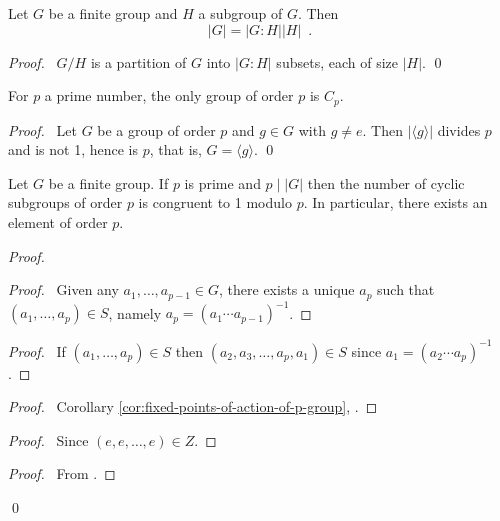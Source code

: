 \begin{thm}
Let $G$ be a finite group and $H$ a subgroup of $G$. Then
\[ |G| = |G : H| |H| \enspace . \]
\end{thm}

\begin{proof}
\pf\ $G/H$ is a partition of $G$ into $|G:H|$ subsets, each of size $|H|$. \qed
\end{proof}

\begin{cor}
For $p$ a prime number, the only group of order $p$ is $C_p$.
\end{cor}

\begin{proof}
\pf\ Let $G$ be a group of order $p$ and $g \in G$ with $g \neq e$. Then $|\langle g \rangle|$ divides $p$ and is not 1, hence is $p$, that is, $G = \langle g \rangle$. \qed
\end{proof}

\begin{thm}
Let $G$ be a finite group. If $p$ is prime and $p \mid |G|$ then the number of cyclic subgroups of order $p$ is congruent to 1 modulo $p$. In particular, there exists an element of order $p$.
\end{thm}

\begin{proof}
\pf
{}
\begin{proof}
	\pf\ Given any $a_1, \ldots, a_{p-1} \in G$, there exists a unique $a_p$ such that $(a_1, \ldots, a_p) \in S$, namely $a_p = (a_1 \cdots a_{p-1})^{-1}$.
\end{proof}
\begin{proof}
	\pf\ If $(a_1, \ldots, a_p) \in S$ then $(a_2, a_3, \ldots, a_p, a_1) \in S$ since $a_1 = (a_2 \cdots a_p)^{-1}$.
\end{proof}
\begin{proof}
	\pf\ Corollary \ref{cor:fixed-points-of-action-of-p-group}, .
\end{proof}
\begin{proof}
	\pf\ Since $(e, e, \ldots, e) \in Z$.
\end{proof}
\begin{proof}
	\pf\ From .
\end{proof}
\qed
\end{proof}

